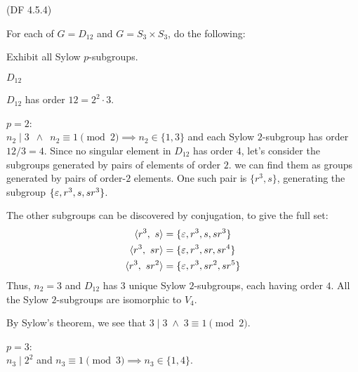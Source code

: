 \begin{problem}{(\textsf{DF 4.5.4})}

  \noindent
  For each of $G=D_{12}$ and $G=S_3 \times S_3$, do the following:
  \begin{enumalph}
    \item Exhibit all Sylow $p$-subgroups.
    \begin{Answer}
      \begin{enumalph}
        \item $D_{12}$
          
          \noindent
          $D_{12}$ has order $12 = 2^2 \cdot 3$.
          \begin{enumalph}

            \bigskip
            \item $p=2$: \\
              $n_2 \mid 3\ \; \land \;\ n_2 \equiv 1 \pmod 2 \implies n_2 \in \{1, 3\}$
              and each Sylow $2$-subgroup has order $12/3 = 4$.
              Since no singular element in $D_{12}$ has order $4$,
              let's consider the subgroups generated by pairs
              of elements of order $2$.
              we can find them as groups generated by
              pairs of order-$2$ elements.
              One such pair is $\{r^3, s\}$,
              generating the subgroup $\{\varepsilon, r^3, s, sr^3 \}$.

              \noindent
              The other subgroups can be discovered by conjugation, to give the full set:
              \begin{align*}
                \langle r^3,\ s \rangle &= \{\varepsilon, r^3, s, sr^3 \} \\
                \langle r^3,\ sr \rangle &= \{\varepsilon, r^3, sr, sr^4 \} \\
                \langle r^3,\ sr^2 \rangle &= \{\varepsilon, r^3, sr^2, sr^5 \}
              \end{align*}
              \noindent
              Thus, $n_2 = 3$ and $D_{12}$ has $3$ unique Sylow $2$-subgroups,
              each having order $4$.
              All the Sylow $2$-subgroups are isomorphic to $V_4$.

              \noindent
              By Sylow's theorem, we see that $3 \mid 3 \; \land \; 3 \equiv 1 \pmod 2$.

            \bigskip
            \item $p=3$:\\
              $n_3 \mid 2^2$ and $n_3 \equiv 1 \pmod 3 \implies n_3 \in \{1, 4\}$.


\end{enumalph}
\end{enumalph}
\end{Answer}
\end{enumalph}
\end{problem}

